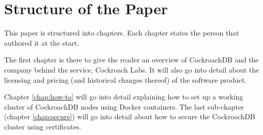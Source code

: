 \section*{Structure of the Paper}
This paper is structured into  chapters. Each chapter states the person that authored it at the start.

\medskip
The first chapter is there to give the reader an overview of CockroachDB and the company behind the service, Cockroach Labs. It will also go into detail about the licensing and pricing (and historical changes thereof) of the software product.


\bigskip
Chapter \ref{chap:how-to} will go into detail explaining how to set up a working cluster of CockroachDB nodes using Docker containers. The last sub-chapter (chapter \ref{chap:secure}) will go into detail about how to secure the CockroachDB cluster using certificates.
